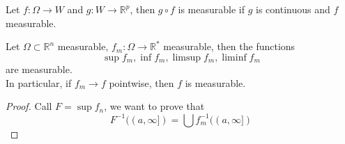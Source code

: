 \documentclass[../main.tex]{subfiles}
\begin{document}
\begin{rmq}
Let $f:\Omega\to W$ and $g:W\to \mathbb{R}^{p}$, then $g\circ f$ is measurable if $g$ is continuous and $f$ measurable.
\end{rmq}
\begin{lemma}
Let $\Omega \subset \mathbb{R}^n$ measurable, $f_m:\Omega\to \mathbb{R}^{*}$ measurable, then the functions
\[ 
\sup f_m, \inf f_m, \limsup f_m, \liminf f_m
\]
are measurable.\\
In particular, if $f_m\to f$ pointwise, then $f$ is measurable.
\begin{proof}
Call $F= \sup f_n$, we want to prove that
\[ 
	F^{-1}( ( a, \infty ] ) = \bigcup f_m^{-1}( ( a, \infty ] ) 
\]

\end{proof}

\end{lemma}
\end{document}
